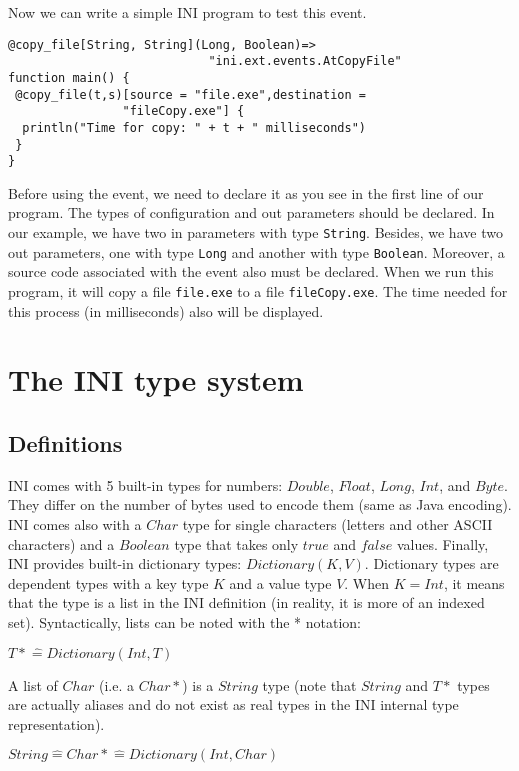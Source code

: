 \documentclass[11pt]{report}
\begin{document}
Now we can write a simple INI program to test this event.
\begin{lstlisting}
@copy_file[String, String](Long, Boolean)=>
                            "ini.ext.events.AtCopyFile"
function main() {
 @copy_file(t,s)[source = "file.exe",destination = 
                "fileCopy.exe"] {
  println("Time for copy: " + t + " milliseconds")
 }
}
\end{lstlisting}
Before using the event, we need to declare it as you see in the first line of our program. The types of configuration and out parameters should be declared. In our example, we have two in parameters with type \texttt{String}. Besides, we have two out parameters, one with type \texttt{Long} and another with type \texttt{Boolean}. Moreover, a source code associated with the event also must be declared. When we run this program, it will copy a file \texttt{file.exe} to a file \texttt{fileCopy.exe}. The time needed for this process (in milliseconds) also will be displayed.

\chapter{The INI type system}

\section{Definitions}

INI comes with 5 built-in types for numbers: $Double$, $Float$, $Long$, $Int$, and $Byte$. They differ on the number of bytes used to encode them (same as Java encoding). INI comes also with a $Char$ type for single characters (letters and other ASCII characters) and a $Boolean$ type that takes only $true$ and $false$ values.
Finally, INI provides built-in dictionary types: $Dictionary(K,V)$. Dictionary types are dependent types with a key type $K$ and a value type $V$. When $K=Int$, it means that the type is a list in the INI definition (in reality, it is more of an indexed set). Syntactically, lists can be noted with the * notation:

\begin{center}
$T* \widehat= Dictionary(Int,T)$
\end{center}

A list of $Char$ (i.e. a $Char*$) is a $String$ type (note that $String$ and $T*$ types are actually aliases and do not exist as real types in the INI internal type representation).

\begin{center}
$String \widehat= Char* \widehat= Dictionary(Int,Char)$
\end{center}
\end{document}
